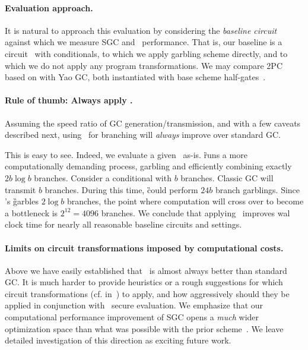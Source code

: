 \paragraph{Evaluation approach.}  It is natural to approach this evaluation by considering the {\em baseline circuit} against which we measure SGC and \ourscheme\ performance.    That is, our baseline is a circuit \cir\ with conditionals, to which we apply garbling scheme directly, and to which we do not apply any program transformations.  We may compare 2PC based on \ourscheme with  Yao GC, both instantiated with base scheme half-gates~\cite{EC:ZahRosEva15}.



\paragraph{Rule of thumb: Always apply \ourscheme.}  Assuming the speed ratio of GC generation/transmission, and with a few caveats described next, using \ourscheme\ for branching will {\em always} improve over standard GC. 

This is easy to see.  Indeed, we evaluate a given \cir\ as-is.  \G runs a more computationally demanding  process, garbling and efficiently combining exactly $2 b \log b$ branches.  Consider a conditional with $b$ branches.  Classic GC will transmit $b$ branches.  During this time, \G could perform $24 b$ branch garblings. Since \ourscheme's \G garbles $2\log b$ branches, the point where computation will cross over to become a bottleneck is $2^{12} = 4096$ branches.  We conclude that applying \ourscheme\ improves wal clock time for nearly all reasonable baseline circuits and settings.


\paragraph{Limits on circuit transformations imposed by computational costs.}
Above we have easily  established that \ourscheme\ is almost always better than standard GC.   It is much harder to provide heuristics or a rough suggestions for which circuit transformations (cf. in~) to apply, and how aggressively should they be applied in conjunction with \ourscheme\ secure evaluation.  We emphasize that our computational performance improvement of SGC opens a {\em much} wider optimization space than what was possible with the prior scheme~\HK.  We leave detailed investigation of this direction as exciting future work.
 

